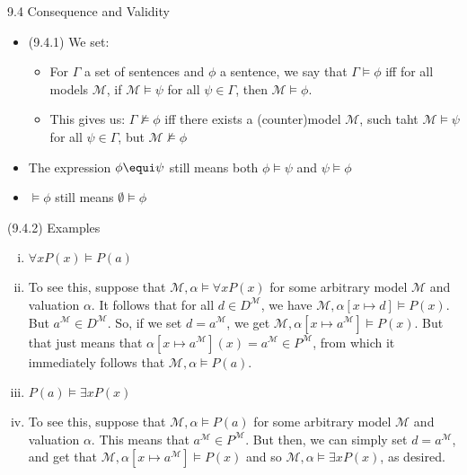 \begin{frame}{9.4 Consequence and Validity}

	\begin{itemize}
	
		\item (9.4.1) We set:
		
		\begin{itemize}
		
			\item For $\Gamma$ a set of sentences and $\phi$ a sentence, we say that $\Gamma\vDash\phi$ iff for all models $\mathcal{M}$, if $\mathcal{M}\vDash\psi$ for all $\psi\in\Gamma$, then $\mathcal{M}\vDash\phi$.
			
			\item This gives us: $\Gamma\nvDash\phi$ iff there exists a (counter)model $\mathcal{M}$, such taht $\mathcal{M}\vDash\psi$ for all $\psi\in\Gamma$, but $\mathcal{M}\nvDash\phi$
		
		\end{itemize}
		\item The expression $\phi\equi \psi$ still means both $\phi\vDash\psi$ and $\psi\vDash\phi$
		
		\item $\vDash\phi$ still means $\emptyset\vDash\phi$
	
	\end{itemize}

\end{frame}

\begin{frame}{(9.4.2) Examples}

\begin{enumerate}[(i)]
		
		\item $\forall xP(x)\vDash P(a)$
		
		\item[] To see this, suppose that $\mathcal{M},\alpha\vDash\forall xP(x)$ for some arbitrary model $\mathcal{M}$ and valuation $\alpha$. It follows that for all $d\in D^\mathcal{M}$, we have $\mathcal{M},\alpha[x\mapsto d]\vDash P(x)$. But $a^\mathcal{M}\in D^\mathcal{M}$. So, if we set $d=a^\mathcal{M}$, we get $\mathcal{M},\alpha[x\mapsto a^\mathcal{M}]\vDash P(x)$. But that just means that $\alpha[x\mapsto a^\mathcal{M}](x)=a^\mathcal{M}\in P^\mathcal{M}$, from which it immediately follows that $\mathcal{M},\alpha\vDash P(a)$.
		
		\item $P(a)\vDash\exists xP(x)$
		
		\item[] To see this, suppose that $\mathcal{M},\alpha\vDash P(a)$ for some arbitrary model $\mathcal{M}$ and valuation $\alpha$. This means that $a^\mathcal{M}\in P^\mathcal{M}$. But then, we can simply set $d=a^\mathcal{M}$, and get that $\mathcal{M},\alpha[x\mapsto a^\mathcal{M}]\vDash P(x)$ and so $\mathcal{M},\alpha\vDash\exists xP(x)$, as desired.

\end{enumerate}

\end{frame}

